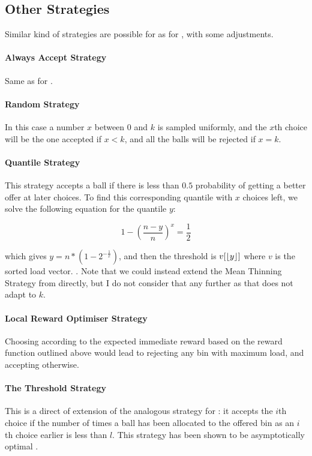 \subsection{Other Strategies}

Similar kind of strategies are possible for \KThinning as for \TwoThinning, with some adjustments.

\paragraph{Always Accept Strategy} Same as for \TwoThinning.


\paragraph{Random Strategy} In this case a number $x$ between $0$ and $k$ is sampled uniformly, and the $x$th choice will be the one accepted if $x<k$, and all the balls will be rejected if $x=k$.



\paragraph{Quantile Strategy} This strategy accepts a ball if there is less than $0.5$ probability of getting a better offer at later choices. To find this corresponding quantile with $x$ choices left, we solve the following equation for the quantile $y$:

\begin{equation} \label{meankthinning}
1 - (\frac{n-y}{n})^x = \frac{1}{2}
\end{equation}

which gives $y = n * (1 - 2^{-\frac{1}{x}})$, and then the threshold is $v[\lfloor y\rfloor]$ where $v$ is the sorted load vector. . Note that we could instead extend the Mean Thinning Strategy from \TwoThinning directly, but I do not consider that any further as that does not adapt to $k$.


\paragraph{Local Reward Optimiser Strategy} Choosing according to the expected immediate reward based on the reward function outlined above would lead to rejecting any bin with maximum load, and accepting otherwise.


\paragraph{The Threshold Strategy} This is a direct of extension of the analogous strategy for \TwoThinning: it accepts the $i$th choice if the number of times a ball has been allocated to the offered bin as an $i$th choice earlier is less than $l$. This strategy has been shown to be asymptotically optimal \cite{feldheim2020dthinning}.


